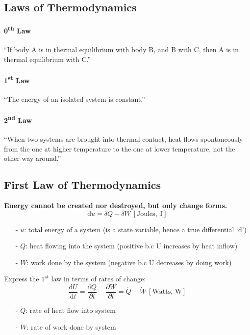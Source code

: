 \documentclass[12pt, a4paper]{article}
\begin{document}
\subsection{Laws of Thermodynamics}

\paragraph{0\textsuperscript{th} Law} ``If body A is in thermal equilibrium with body B, and B with C, then A is in thermal equilibrium with C.''

\paragraph{1\textsuperscript{st} Law} ``The energy of an isolated system is constant.''

\paragraph{2\textsuperscript{nd} Law} ``When two systems are brought into thermal contact, heat flows spontaneously from the one at higher temperature to the one at lower temperature, not the other way around.''

\subsection{First Law of Thermodynamics}
\textbf{Energy cannot be created nor destroyed, but only change forms.}
\[ 
    \mathrm{d}u = \delta Q - \delta W \  [\text{Joules, \ J}]  
\] 
\begin{itemize}
    \item[-] $u$: total energy of a system (is a state variable, hence a true differential `d’)
    \item[-] $Q$: heat flowing into the system (positive b.c U increases by heat inflow) 
    \item[-] $W$: work done by the system (negative b.c U decreases by doing work)
\end{itemize}
 
Express the $1^{st}$ law in terms of rates of change:
\[ 
    \frac{\mathrm{d}U}{\mathrm{d}t} = \frac{\partial Q}{\partial t} - \frac{\partial W}{\partial t} = \dot{Q}-\dot{W} \ [\text{Watts, \ W}]  
\]
\begin{itemize}
    \item[-] \textbf{$\dot{Q}$}: rate of heat flow into system 
    \item[-] \textbf{$\dot{W}$}: rate of work done by system
\end{itemize}
 
\end{document}
